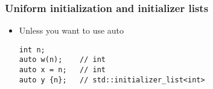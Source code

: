 \begin{frame}[fragile,t]
\frametitle{Uniform initialization and initializer lists}

\vskip 12pt
\begin{itemize}
\item Unless you want to use auto
\begin{verbatim}
int n;
auto w(n);    // int
auto x = n;   // int
auto y {n};   // std::initializer_list<int>
\end{verbatim}
\end{itemize}
\end{frame}
